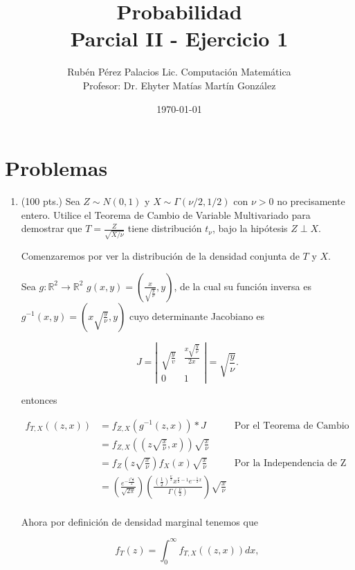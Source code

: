 \documentclass[letterpaper]{article}
\title{Probabilidad \\Parcial II - Ejercicio 1}
\author{Rubén Pérez Palacios Lic. Computación Matemática\\Profesor: Dr. Ehyter Matías Martín González}
\date{\today}
\theoremstyle{definition}
\theoremstyle{lemathm}
\theoremstyle{lemathm}
\theoremstyle{lemademthm}
\newcommand{\abs}[1]{\left| #1 \right| }
\newcommand{\pars}[1]{\left( #1 \right) }
\newcommand{\R}{\mathbb{R}}
\newcommand{\1}{\mathbbm{1}}
\begin{document}
	\maketitle
    
    \section*{Problemas}

    \begin{enumerate}
        
		\item (100 pts.) Sea $Z\sim N(0,1)$ y $X\sim\Gamma( \nu/2,1/2)$ con $\nu>0$ no precisamente entero. Utilice el Teorema de Cambio de Variable Multivariado para demostrar que $T=\frac{Z}{\sqrt{X/\nu}}$ tiene distribución $t_\nu$, bajo la hipótesis $Z\perp X$.
		
		Comenzaremos por ver la distribución de la densidad conjunta de $T$ y $X$. 
		
		Sea $g: \R^2\to\R^2$ $g(x,y) = \pars{\frac{x}{\sqrt{\frac{y}{\nu}}}, y}$, de la cual su función inversa es $g^{-1}(x,y) = \pars{x\sqrt{\frac{y}{\nu}}, y}$ cuyo determinante Jacobiano es
		
		\[J = \abs{\begin{array}{cc}
			\sqrt{\frac{y}{v}} & \frac{x\sqrt{\frac{y}{\nu}}}{2x}\\
			0 & 1
		\end{array}} = \sqrt{\frac{y}{\nu}}.\]

		entonces

		\begin{align*}
			f_{T,X}((z,x)) &= f_{Z,X}(g^{-1}(z,x)) * J &\text{Por el Teorema de Cambio de Variable Multivariado}\\
			&= f_{Z,X}\pars{\pars{z\sqrt{\frac{x}{\nu}},x}} \sqrt{\frac{x}{\nu}}\\
			&= f_{Z}\pars{z\sqrt{\frac{x}{\nu}}}f_{X}(x) \sqrt{\frac{x}{\nu}} & \text{Por la Independencia de Z y X}\\
			&= \pars{\frac{e^{-\frac{z^2\frac{x}{\nu}}{2}}}{\sqrt{2\pi}}} \pars{\frac{\pars{\frac{1}{2}}^{\frac{\nu}{2}} x^{\frac{\nu}{2}-1} e^{-\frac{1}{2}x}}{\Gamma\pars{\frac{\nu}{2}}}} \sqrt{\frac{x}{\nu}}\\
		\end{align*}

		Ahora por definición de densidad marginal tenemos que

		\[f_T(z) = \int_{0}^{\infty} f_{T,X}((z,x)) dx,\]

		\newpage


\end{enumerate}
\end{document}
